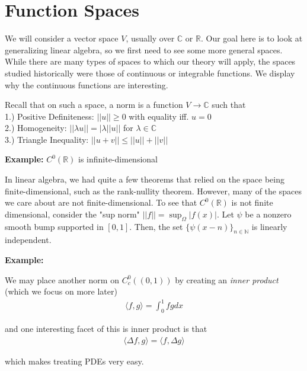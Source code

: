 \documentclass{article}
\newcommand{\N}{{\mathbb{N}}}
\newcommand{\R}{{\mathbb{R}}}
\newcommand{\C}{{\mathbb{C}}}
\newcommand{ \norm }[1]{{ || {#1}||}}
\begin{document}
	
	\section{Function Spaces}
	
	We will consider a vector space $V$, usually over $\C$ or $\R$. Our goal here is to look at generalizing linear algebra, so we first need to see some more general spaces. While there are many types of spaces to which our theory will apply, the spaces studied historically were those of continuous or integrable functions. We display why the continuous functions are interesting. 
	
	
	Recall that on such a space, a norm is a function $V \to \C$ such that \\
	1.) Positive Definiteness: $\norm{u} \geq 0$ with equality iff. $u=0$ \\
	2.) Homogeneity: $\norm{\lambda u } = |\lambda \norm{u}$ for $\lambda \in \C$ \\
	3.) Triangle Inequality: $\norm{u+v} \leq \norm{u} + \norm{v}$
	
	\vspace{0.25 cm}
	
	\textbf{Example:} $C^{0}(\R)$ is infinite-dimensional
	
	In linear algebra, we had quite a few theorems that relied on the space being finite-dimensional, such as the rank-nullity theorem. However, many of the spaces we care about are not finite-dimensional. To see that $C^{0}(\R)$ is not finite dimensional, consider the "sup norm" $\norm{f} = \sup_{\Omega} |f(x)|$. Let $\psi$ be a nonzero smooth bump supported in $[0,1]$. Then, the set $\{\psi(x-n)\}_{n \in \N}$ is linearly independent. 
	
	\vspace{0.25 cm}
	
	\textbf{Example:}
	
	We may place another norm on $C^{0}_{c}((0,1))$ by creating an \textit{inner product} (which we focus on more later)
	\begin{align*}
		\langle f,g \rangle = \int_{0}^{1} fg dx
	\end{align*}
	
	and one interesting facet of this is inner product is that 
	\begin{align*}
		\langle \Delta f, g \rangle  = \langle f, \Delta g \rangle 
	\end{align*}
	
	which makes treating PDEs very easy. 
	
\end{document}
